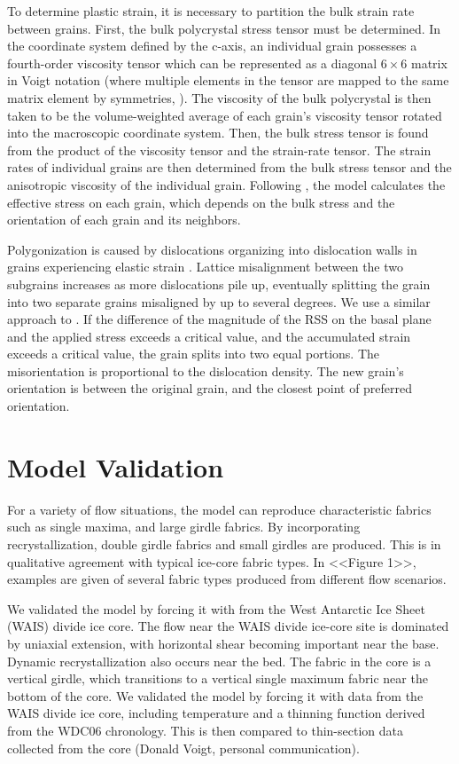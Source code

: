 \documentclass{igs}
\begin{document}
To determine plastic strain, it is necessary to partition the bulk strain rate between grains. First, the bulk polycrystal stress tensor must be determined. In the coordinate system defined by the c-axis, an individual grain possesses a fourth-order viscosity tensor which can be represented as a diagonal $6 \times 6$ matrix in Voigt notation (where multiple elements in the tensor are mapped to the same matrix element by symmetries, \citet{vnote}). The viscosity of the bulk polycrystal is then taken to be the volume-weighted average of each grain's viscosity tensor rotated into the macroscopic coordinate system. Then, the bulk stress tensor is found from the product of the viscosity tensor and the strain-rate tensor. The strain rates of individual grains are then determined from the bulk stress tensor and the anisotropic viscosity of the individual grain. Following \citet{azuma96}, the model calculates the effective stress on each grain, which depends on the bulk stress and the orientation of each grain and its neighbors.  

Polygonization is caused by dislocations organizing into dislocation walls in grains experiencing elastic strain \citep{duval1995}. Lattice misalignment between the two subgrains increases as more dislocations pile up, eventually splitting the grain into two separate grains misaligned by up to several degrees. We use a similar approach to \citet{thorsteinsson2002nni}. If the difference of the magnitude of the RSS on the basal plane and the applied stress exceeds a critical value, and the accumulated strain exceeds a critical value, the grain splits into two equal portions. The misorientation is proportional to the dislocation density. The new grain's orientation is between the original grain, and the closest point of preferred orientation. 



\section{Model Validation}
For a variety of flow situations, the model can reproduce characteristic fabrics such as single maxima, and large girdle fabrics. By incorporating recrystallization, double girdle fabrics and small girdles are produced. This is in qualitative agreement with typical ice-core fabric types. In <<Figure 1>>, examples are given of several fabric types produced from different flow scenarios. 

We validated the model by forcing it with from the West Antarctic Ice Sheet (WAIS) divide ice core. The flow near the WAIS divide ice-core site is dominated by uniaxial extension, with horizontal shear becoming important near the base. Dynamic recrystallization also occurs near the bed. The fabric in the core is a vertical girdle, which transitions to a vertical single maximum fabric near the bottom of the core. We validated the model by forcing it with data from the WAIS divide ice core, including temperature and a thinning function derived from the WDC06 chronology. This is then compared to thin-section data collected from the core (Donald Voigt, personal communication).
\end{document}

